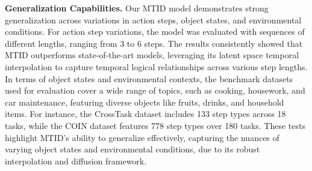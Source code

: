 \textbf{Generalization Capabilities.} Our MTID model demonstrates strong generalization across variations in action steps, object states, and environmental conditions. For action step variations, the model was evaluated with sequences of different lengths, ranging from 3 to 6 steps. The results consistently showed that MTID outperforms state-of-the-art models, leveraging its latent space temporal interpolation to capture temporal logical relationships across various step lengths. In terms of object states and environmental contexts, the benchmark datasets used for evaluation cover a wide range of topics, such as cooking, housework, and car maintenance, featuring diverse objects like fruits, drinks, and household items. For instance, the CrossTask dataset includes 133 step types across 18 tasks, while the COIN dataset features 778 step types over 180 tasks. These tests highlight MTID's ability to generalize effectively, capturing the nuances of varying object states and environmental conditions, due to its robust interpolation and diffusion framework.


